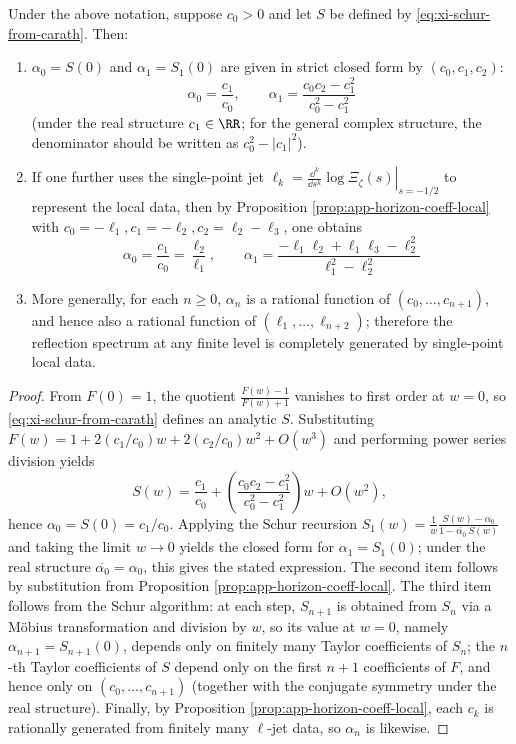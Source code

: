 \begin{theorem}\label{thm:xi-verblunsky-from-local-jet}
Under the above notation, suppose \(c_0>0\) and let \(S\) be defined by \eqref{eq:xi-schur-from-carath}.
Then:
\begin{enumerate}
  \item \(\alpha_0=S(0)\) and \(\alpha_1=S_1(0)\) are given in strict closed form by \((c_0,c_1,c_2)\):
  \[
  \boxed{\;
  \alpha_0=\frac{c_1}{c_0},\qquad
  \alpha_1=\frac{c_0c_2-c_1^2}{c_0^2-c_1^2}\;}
  \]
  (under the real structure \(c_1\in\RR\); for the general complex structure, the denominator should be written as \(c_0^2-|c_1|^2\)).
  \item If one further uses the single-point jet
  \(
  \ell_k=\left.\frac{\dd^k}{\dd s^k}\log\Xi_\zeta(s)\right|_{s=-1/2}
  \)
  to represent the local data, then by Proposition \ref{prop:app-horizon-coeff-local} with \(c_0=-\ell_1,c_1=-\ell_2,c_2=\ell_2-\ell_3\), one obtains
  \[
  \boxed{\;
  \alpha_0=\frac{c_1}{c_0}=\frac{\ell_2}{\ell_1},\qquad
  \alpha_1=\frac{-\ell_1\ell_2+\ell_1\ell_3-\ell_2^2}{\ell_1^2-\ell_2^2}\;}
  \]
  \item More generally, for each \(n\ge 0\), \(\alpha_n\) is a rational function of \((c_0,\dots,c_{n+1})\), and hence also a rational function of \((\ell_1,\dots,\ell_{n+2})\); therefore the reflection spectrum at any finite level is completely generated by single-point local data.
\end{enumerate}
\end{theorem}

\begin{proof}
From \(F(0)=1\), the quotient \(\frac{F(w)-1}{F(w)+1}\) vanishes to first order at \(w=0\), so \eqref{eq:xi-schur-from-carath} defines an analytic \(S\).
Substituting \(F(w)=1+2(c_1/c_0)w+2(c_2/c_0)w^2+O(w^3)\) and performing power series division yields
\[
S(w)=\frac{c_1}{c_0}+\left(\frac{c_0c_2-c_1^2}{c_0^2-c_1^2}\right)w+O(w^2),
\]
hence \(\alpha_0=S(0)=c_1/c_0\).
Applying the Schur recursion
\(
S_1(w)=\frac{1}{w}\frac{S(w)-\alpha_0}{1-\overline{\alpha_0}\,S(w)}
\)
and taking the limit \(w\to 0\) yields the closed form for \(\alpha_1=S_1(0)\); under the real structure \(\overline{\alpha_0}=\alpha_0\), this gives the stated expression.
The second item follows by substitution from Proposition \ref{prop:app-horizon-coeff-local}.
The third item follows from the Schur algorithm: at each step, \(S_{n+1}\) is obtained from \(S_n\) via a M\"obius transformation and division by \(w\), so its value at \(w=0\), namely \(\alpha_{n+1}=S_{n+1}(0)\), depends only on finitely many Taylor coefficients of \(S_n\);
the \(n\)-th Taylor coefficients of \(S\) depend only on the first \(n{+}1\) coefficients of \(F\), and hence only on \((c_0,\dots,c_{n+1})\) (together with the conjugate symmetry under the real structure).
Finally, by Proposition \ref{prop:app-horizon-coeff-local}, each \(c_k\) is rationally generated from finitely many \(\ell\)-jet data, so \(\alpha_n\) is likewise.
\end{proof}

